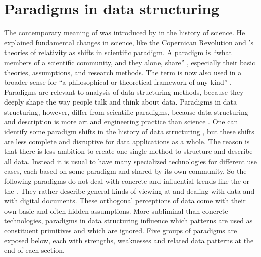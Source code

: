 \section{Paradigms in data structuring}
\label{sec:paradigms}

The contemporary meaning of  was introduced by
\textcite{Kuhn1962} in the history of science. He explained fundamental changes
in science, like the Copernican Revolution and 's
theories of relativity as shifts in scientific paradigm. A paradigm is ``what
members of a scientific community, and they alone, share'' \cite{Kuhn1974},
especially their basic theories, assumptions, and research methods. The term is
now also used in a broader sense for ``a philosophical or theoretical framework
of any kind'' \cite{Webster2011}. Paradigms are relevant to analysis of data
structuring methods, because they deeply shape the way people talk and think
about data. Paradigms in data structuring, however, differ from scientific
paradigms, because data structuring and description is more art and engineering
practice than science \cite{Simsion2007}.  One can identify some paradigm
shifts in the history of data structuring \cite[to give some
examples]{Codd1970,Chen1976,Gamma1994}, but these shifts are less complete and
disruptive for data applications as a whole. The reason is that there is less
ambition to create one single method to structure and describe all data.
Instead it is usual to have many specialized technologies for different use
cases, each based on some paradigm and shared by its own community. So the
following paradigms do not deal with concrete and influential trends like the
 or the .
They rather describe general kinds of viewing at and dealing with data and with
digital documents. These orthogonal perceptions of data come with their own
basic and often hidden assumptions.  More subliminal than concrete
technologies, paradigms in data structuring influence which patterns are used
as constituent primitives and which are ignored. Five groups of paradigms are
exposed below, each with strengths, weaknesses and related data patterns at the
end of each section.

